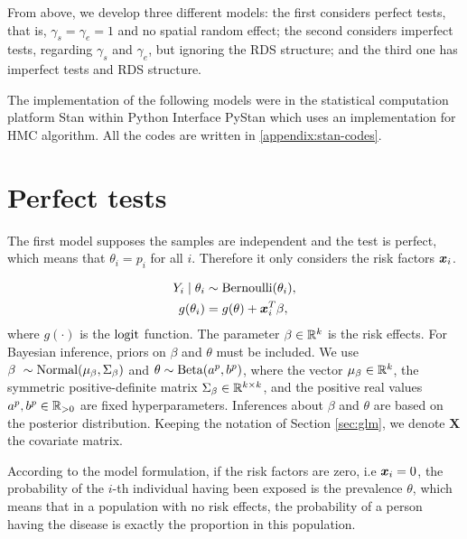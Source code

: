 From above, we develop three different models: the first considers perfect 
tests, that is, $\gamma_s = \gamma_e = 1$ and no spatial random effect; 
the second considers imperfect tests, regarding $\gamma_s$ and $\gamma_e$, 
but ignoring the RDS structure; and the third one has imperfect tests and 
RDS structure. 

The implementation of the following models were in the statistical computation
platform Stan \cite{carpenter2017stan} within Python Interface PyStan
\cite{pystan} which uses an implementation for HMC algorithm. All the codes
are written in \autoref{appendix:stan-codes}.

\section{Perfect tests}

The first model supposes the samples are independent and the test is perfect,
which means that $\theta_i = p_i$ for all $i$. Therefore it only considers the risk factors $\boldsymbol{x}_i$. 

\begin{equation}
  \label{model:perfect-tests}
  \begin{aligned}
    Y_i \mid \theta_i &\sim \operatorname{Bernoulli}(\theta_i), \\
    g(\theta_i) &= g(\theta) + \boldsymbol{x}_i^T\beta, 
  \end{aligned}  
\end{equation}
where $g(\cdot)$ is the $\operatorname{logit}$ function.
The parameter $\beta \in \mathbb{R}^{k}$ is the risk effects. For Bayesian inference, priors on
$\beta$ and $\theta$ must be included. We use $\beta ~ \sim \operatorname{Normal}(\mu_{\beta}, \Sigma_{\beta})$
and $\theta \sim \operatorname{Beta}(a^{p}, b^p)$, where the vector $\mu_{\beta}
\in \mathbb{R}^{k}$, the symmetric positive-definite matrix $\Sigma_{\beta} \in
\mathbb{R}^{k\times k}$, and the positive real values $a^p, b^p \in \mathbb{R}_{>0}$ are fixed
hyperparameters. Inferences about $\beta$ and $\theta$ are based on the
posterior distribution. Keeping the notation of
Section \ref{sec:glm}, we denote $\boldsymbol{X}$ the covariate matrix. 

\begin{remark}
  \label{remark:interpretation-prevalence}
  According to the model formulation, if the risk factors are zero, i.e $\boldsymbol{x}_i
  = 0$, the probability of the $i$-th individual having been exposed is the prevalence $\theta$, which means that in
a population with no risk effects, the probability of a person having the
disease is exactly the proportion in this population. 
\end{remark}

